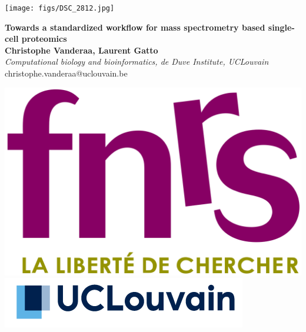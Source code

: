 \documentclass{article}
\title{}
\author{}
\date{}
\begin{document}


\begin{center}
\colorbox{lgray}{
  \begin{minipage}{3cm}
    
    \texttt{[image: figs/DSC\_2812.jpg]}
  \end{minipage}
  \begin{minipage}{.74\textwidth}
    \begin{center}
      \huge \textbf{Towards a standardized workflow for mass spectrometry based single-cell proteomics} \\
      \vspace{0.4cm}
      \Large \textbf{Christophe Vanderaa, Laurent Gatto} \\
      \Large \textit{Computational biology and bioinformatics, de Duve Institute, UCLouvain } \\
      \vspace{0.4cm}
      \normalsize christophe.vanderaa@uclouvain.be \\
    \end{center}
  \end{minipage}
  \begin{minipage}{3.7cm}
      \includegraphics[width=0.7\linewidth, right]{figs/fnrs.png} \\
      \vspace{0.5cm}
      \includegraphics[width=1.1\linewidth, right]{figs/ucl.png}
  \end{minipage}
}
\end{center}
\end{document}
